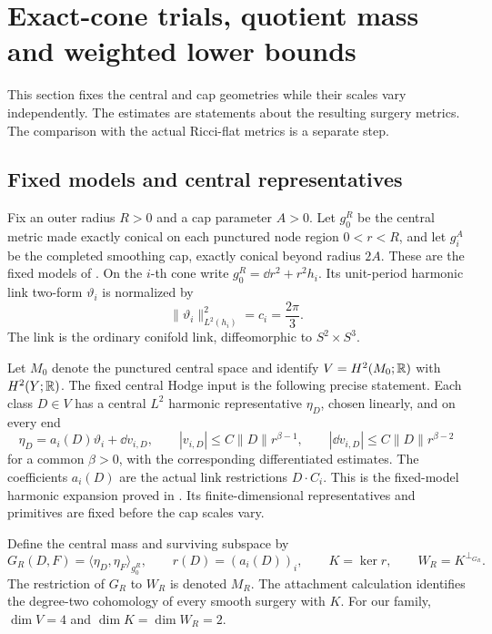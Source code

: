 \section{Exact-cone trials, quotient mass and weighted lower bounds}
\label{sec:model-energy}

This section fixes the central and cap geometries while their scales vary
independently. The estimates are statements about the resulting surgery
metrics. The comparison with the actual Ricci-flat metrics is a separate
step.

\subsection{Fixed models and central representatives}

Fix an outer radius $R>0$ and a cap parameter $A>0$. Let $g_0^R$ be
the central metric made exactly conical on each punctured node region
$0<r<R$, and let $g_i^A$ be the completed smoothing cap, exactly
conical beyond radius $2A$. These are the fixed models of
\cite[Sections~4--5]{wuebben-hodge}. On the $i$-th cone write
$g_0^R=\dd r^2+r^2h_i$. Its unit-period harmonic link two-form
$\vartheta_i$ is normalized by
\begin{equation}\label{eq:link-normalization}
 \|\vartheta_i\|_{L^2(h_i)}^2=c_i=\frac{2\pi}{3}.
\end{equation}
The link is the ordinary conifold link, diffeomorphic to $S^2\times S^3$.

Let $M_0$ denote the punctured central space and identify
$V=H^2(M_0;\mathbb R)$ with $H^2(Y;\mathbb R)$. The fixed central Hodge input is
the following precise statement. Each class $D\in V$ has a central
$L^2$ harmonic representative $\eta_D$, chosen linearly, and on every
end
\begin{equation}\label{eq:central-end-expansion}
 \eta_D=a_i(D)\vartheta_i+\dd v_{i,D},\qquad
 |v_{i,D}|\le C\|D\|r^{\beta-1},\qquad
 |\dd v_{i,D}|\le C\|D\|r^{\beta-2}
\end{equation}
for a common $\beta>0$, with the corresponding differentiated estimates.
The coefficients $a_i(D)$ are the actual link restrictions
$D\cdot C_i$. This is the fixed-model harmonic expansion proved in
\cite[Lemma~5.1]{wuebben-hodge}. Its finite-dimensional representatives
and primitives are fixed before the cap scales vary.

Define the central mass and surviving subspace by
\begin{equation}\label{eq:model-central-mass}
 G_R(D,F)=\langle\eta_D,\eta_F\rangle_{g_0^R},\qquad
 r(D)=(a_i(D))_i,\qquad K=\ker r,\qquad W_R=K^{\perp_{G_R}}.
\end{equation}
The restriction of $G_R$ to $W_R$ is denoted $M_R$. The attachment
calculation identifies the degree-two cohomology of every smooth
surgery with $K$. For our family, $\dim V=4$ and
$\dim K=\dim W_R=2$.

